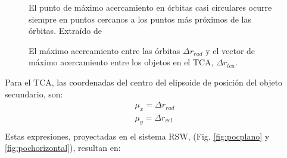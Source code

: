 {\begin{figure}[!h]
\begin{minipage}[t]{0.48\textwidth}
 \centering
 \caption[M\'aximo acercamiento en \'orbitas circulares]{El punto de m\'aximo acercamiento en \'orbitas casi circulares ocurre siempre en puntos cercanos a los puntos m\'as pr\'oximos de las \'orbitas. Extra\'ido de \cite{leichen}}
 \label{fig:pocorbcirc}
\end{minipage}
\begin{minipage}[t]{0.48\textwidth}
 \centering
 \caption[]{El m\'aximo acercamiento entre las \'orbitas $\Delta r_{rad}$ y el vector de m\'aximo acercamiento entre los objetos en el TCA, $\Delta r_{tca}$.}
 \label{fig:pocdistancia}
\end{minipage}
\end{figure}
 
Para el TCA, las coordenadas del centro del elipsoide de posici\'on del objeto secundario, son:\\
% 
\begin{gather}
 \mu_{x}=\Delta r_{rad}\\
 \mu_{y}=\Delta r_{vel}\\
\end{gather}
% 
Estas expresiones, proyectadas en el sistema RSW, (Fig. \ref{fig:pocplano} y \ref{fig:pochorizontal}), resultan en:

}
